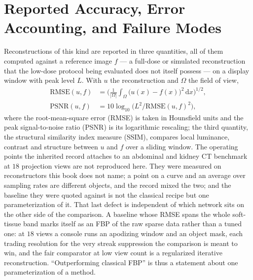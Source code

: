 \section{Reported Accuracy, Error Accounting, and Failure Modes}
\label{sec:ch36-metrics}

Reconstructions of this kind are reported in three quantities, all of them
computed against a reference image $f$ --- a full-dose or simulated
reconstruction that the low-dose protocol being evaluated does not itself possess
--- on a display window with peak level $L$. With $u$ the reconstruction and
$\Omega$ the field of view,
\begin{equation}
  \label{eq:ch36-metrics}
  \begin{aligned}
    \mathrm{RMSE}(u,f) & = \Big( \tfrac{1}{|\Omega|}\int_{\Omega} \big(u(x)-f(x)\big)^{2}\,\mathrm{d}x \Big)^{1/2}, \\[2pt]
    \mathrm{PSNR}(u,f) & = 10\log_{10}\!\big( L^{2}/\mathrm{RMSE}(u,f)^{2} \big),
  \end{aligned}
\end{equation}
where the root-mean-square error (RMSE) is
taken in Hounsfield units and the peak signal-to-noise ratio
(PSNR) is its logarithmic rescaling; the
third quantity, the structural similarity index measure
(SSIM), compares local
luminance, contrast and structure between $u$ and $f$ over a sliding window. The
operating points the inherited record attaches to an abdominal and kidney CT
benchmark at $18$ projection views are not reproduced here. They were measured on
reconstructors this book does not name; a point on a curve and an average over
sampling rates are different objects, and the record mixed the two; and the
baseline they were quoted against is not the classical recipe but one
parameterization of it. That last defect is independent of which network sits on
the other side of the comparison. A baseline whose RMSE spans the whole
soft-tissue band marks itself as an FBP of the raw sparse data rather than a
tuned one: at $18$ views a console runs
an apodizing window and an object mask, each trading resolution for the very
streak suppression the comparison is meant to win, and the fair comparator at
low view count is a regularized iterative reconstruction. ``Outperforming
classical FBP'' is thus a statement about one parameterization of a method.

